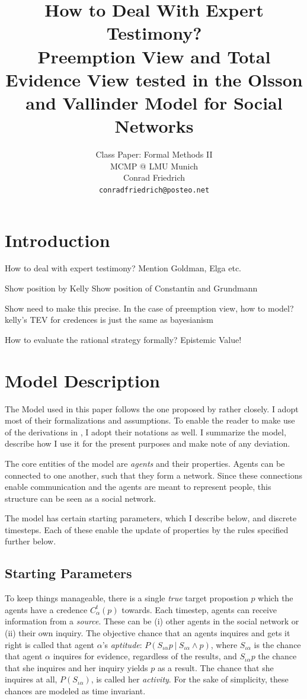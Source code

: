 \documentclass[11pt, a4paper]{article}
\title{\textbf{How to Deal With Expert Testimony?} \\Preemption View and Total Evidence View tested in the Olsson and Vallinder Model for Social Networks }
\author{Class Paper: Formal Methods II \\ MCMP @ LMU Munich \\ Conrad Friedrich \\ \texttt{conradfriedrich@posteo.net}}
\newcommand{\given}[1][]{\:#1\vert\:}
\renewcommand{\i}[1]{\emph{#1}}
\begin{document}
\maketitle
\abstract{}
\section{Introduction}
How to deal with expert testimony? Mention Goldman, Elga etc.

Show position by Kelly
Show position of Constantin and Grundmann

Show need to make this precise. In the case of preemption view, how to model? 
kelly's TEV for credences is just the same as bayesianism 

How to evaluate the rational strategy formally?
Epistemic Value!

\section{Model Description}

The Model used in this paper follows the one proposed by \textcite{Olsson2013} rather closely. I adopt most of their formalizations and assumptions. To enable the reader to make use of the derivations in \textcite{Angere2010}, I adopt their notations as well. I summarize the model, describe how I use it for the present purposes and make note of any deviation.

The core entities of the model are \i{agents} and their properties. Agents can be connected to one another, such that they form a network. Since these connections enable communication and the agents are meant to represent people, this structure can be seen as a social network.

The model has certain starting parameters, which I describe below, and discrete timesteps. Each of these enable the update of properties by the rules specified further below.

\subsection{Starting Parameters}

To keep things manageable, there is a single \i{true} target propostion $p$ which the agents have a credence $C^t_\alpha(p)$ towards. Each timestep, agents can receive information from a \i{source}. These can be (i) other agents in the social network or (ii) their own inquiry. The objective chance that an agents inquires and gets it right is called that agent $\alpha$'s \i{aptitude}: $P(S_{\iota \alpha}p \given S_{\iota \alpha} \land p)$, where $S_{\iota \alpha}$ is the chance that agent $\alpha$ inquires for evidence, regardless of the results, and $S_{\iota \alpha} p$ the chance that she inquires and her inquiry yields $p$ as a result. The chance that she inquires at all, $P(S_{\iota \alpha})$, is called her \i{activity}. For the sake of simplicity, these chances are modeled as time invariant.
\end{document}

